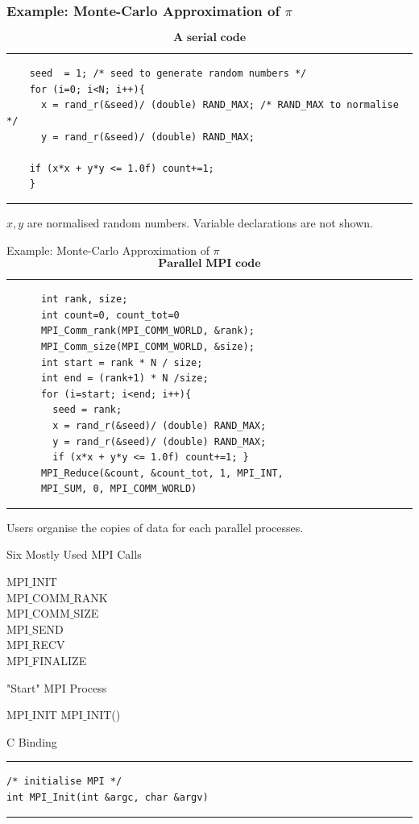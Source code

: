 \documentclass[xcolor=dvipsnames]{beamer}
\begin{document}
\begin{frame}[fragile]
\frametitle{Example: Monte-Carlo Approximation of $\pi$}
$$\textbf{A serial code}$$
\rule{\textwidth}{1pt}
\scriptsize
\begin{verbatim}
    seed  = 1; /* seed to generate random numbers */
    for (i=0; i<N; i++){
      x = rand_r(&seed)/ (double) RAND_MAX; /* RAND_MAX to normalise */ 
      y = rand_r(&seed)/ (double) RAND_MAX;

    if (x*x + y*y <= 1.0f) count+=1;
    } 
\end{verbatim}
\rule{\textwidth}{1pt}
$x,y$ are normalised random numbers. Variable declarations are not shown.
\end{frame}

\begin{frame}[fragile]{Example: Monte-Carlo Approximation of $\pi$}
$$\textbf{Parallel MPI code}$$
\rule{\textwidth}{1pt}
\scriptsize
\begin{verbatim}
      int rank, size;
      int count=0, count_tot=0
      MPI_Comm_rank(MPI_COMM_WORLD, &rank);
      MPI_Comm_size(MPI_COMM_WORLD, &size);
      int start = rank * N / size;
      int end = (rank+1) * N /size;
      for (i=start; i<end; i++){
        seed = rank;
        x = rand_r(&seed)/ (double) RAND_MAX;
        y = rand_r(&seed)/ (double) RAND_MAX;
        if (x*x + y*y <= 1.0f) count+=1; }
      MPI_Reduce(&count, &count_tot, 1, MPI_INT,
      MPI_SUM, 0, MPI_COMM_WORLD)
\end{verbatim}
\rule{\textwidth}{1pt}
Users organise the copies of data for each parallel processes.
\end{frame}

 \begin{frame}{Six Mostly Used MPI Calls}
 \begin{outline}
     \1 MPI$\_$INIT\\
     \1 MPI$\_$COMM$\_$RANK\\
     \1 MPI$\_$COMM$\_$SIZE\\
     \1 MPI$\_$SEND\\
     \1 MPI$\_$RECV\\
     \1 MPI$\_$FINALIZE
 \end{outline}
 \end{frame}

\begin{frame}[fragile]{"Start" MPI Process}
\begin{block}{MPI$\_$INIT}
MPI$\_$INIT()
\end{block}

C Binding
\rule{\textwidth}{1pt}
\scriptsize
\begin{verbatim}
/* initialise MPI */
int MPI_Init(int &argc, char &argv)
\end{verbatim}
\rule{\textwidth}{1pt}
\end{frame}
\end{document}
